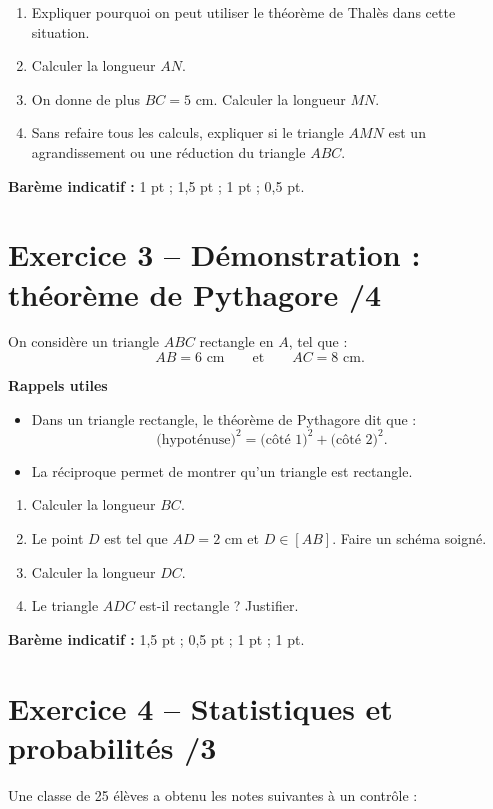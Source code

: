 \documentclass[11pt,a4paper]{article}
\begin{document}
\begin{enumerate}
    \item Expliquer pourquoi on peut utiliser le théorème de Thalès dans cette situation.
    \item Calculer la longueur \(AN\).
    \item On donne de plus \(BC=5\) cm. Calculer la longueur \(MN\).
    \item Sans refaire tous les calculs, expliquer si le triangle \(AMN\) est un agrandissement ou une réduction du triangle \(ABC\).
\end{enumerate}

\textbf{Barème indicatif :} 1 pt ; 1,5 pt ; 1 pt ; 0,5 pt.

\section*{Exercice 3 -- Démonstration : théorème de Pythagore \hfill /4}

On considère un triangle \(ABC\) rectangle en \(A\), tel que :
\[
AB=6 \text{ cm} \qquad \text{et} \qquad AC=8 \text{ cm}.
\]

\textbf{Rappels utiles}
\begin{itemize}[leftmargin=1.2cm]
    \item Dans un triangle rectangle, le théorème de Pythagore dit que :
    \[
    \text{(hypoténuse)}^2=\text{(côté 1)}^2+\text{(côté 2)}^2.
    \]
    \item La réciproque permet de montrer qu’un triangle est rectangle.
\end{itemize}

\begin{enumerate}
    \item Calculer la longueur \(BC\).
    \item Le point \(D\) est tel que \(AD=2\) cm et \(D\in[AB]\). Faire un schéma soigné.
    \item Calculer la longueur \(DC\).
    \item Le triangle \(ADC\) est-il rectangle ? Justifier.
\end{enumerate}

\textbf{Barème indicatif :} 1,5 pt ; 0,5 pt ; 1 pt ; 1 pt.

\section*{Exercice 4 -- Statistiques et probabilités \hfill /3}

Une classe de 25 élèves a obtenu les notes suivantes à un contrôle :
\end{document}
